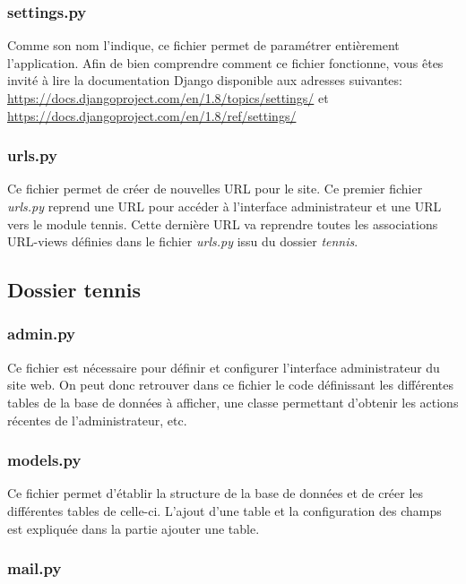 \subsubsection{settings.py}

Comme son nom l'indique, ce fichier permet de paramétrer entièrement l'application. Afin de bien comprendre comment ce fichier fonctionne, vous êtes invité à lire la documentation Django disponible aux adresses suivantes: \url{https://docs.djangoproject.com/en/1.8/topics/settings/} et \url{https://docs.djangoproject.com/en/1.8/ref/settings/}

\subsubsection{urls.py}

Ce fichier permet de créer de nouvelles URL pour le site. Ce premier fichier \textit{urls.py} reprend une URL pour accéder à l'interface administrateur et une URL vers le module tennis. Cette dernière URL va reprendre toutes les associations URL-views définies dans le fichier \textit{urls.py} issu du dossier \textit{tennis}.

\subsection{Dossier tennis}

\subsubsection{admin.py}

Ce fichier est nécessaire pour définir et configurer l'interface administrateur du site web. On peut donc retrouver dans ce fichier le code définissant les différentes tables de la base de données à afficher, une classe permettant d'obtenir les actions récentes de l'administrateur, etc.

\subsubsection{models.py}

Ce fichier permet d'établir la structure de la base de données et de créer les différentes tables de celle-ci. L'ajout d'une table et la configuration des champs est expliquée dans la partie ajouter une table.

\subsubsection{mail.py}

